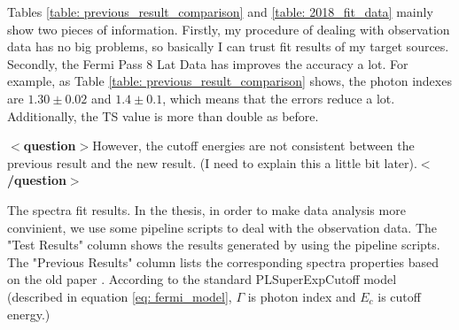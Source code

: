 \documentclass[12pt]{report}
\newcommand{\mycaption}[1]{\protect \caption{#1}}
\newcommand{\question}[1]{
  $<$\textbf{question}$>$#1$<$\textbf{/question}$>$
}
\begin{document}
          Tables \ref{table: previous_result_comparison} and \ref{table: 2018_fit_data} mainly 
          show two pieces of information. Firstly, my procedure of dealing with observation data has no
          big problems, so basically I can trust fit results of my target sources. Secondly, the Fermi 
          Pass 8 Lat Data has improves the accuracy a lot. For example, as Table 
          \ref{table: previous_result_comparison} shows, the photon indexes are 
          $1.30\pm0.02$ and $1.4\pm0.1$, which means that the errors reduce a lot. Additionally, the TS 
          value is more than double as before.
          \question{However, the cutoff energies are not consistent between the previous result and the new result.
            (I need to explain this a little bit later).}
          \vspace{1cm} 
          \begin{table}[!ht]
            \centering
            \vspace{0.5cm}
              \centering
              \mycaption{The spectra fit results. In the thesis, in order to make data analysis more 
                convinient, we use some pipeline scripts to deal with the observation data. 
                The "Test Results" column
                shows the results generated by using the pipeline scripts. The "Previous Results" column lists the 
                corresponding spectra properties based on the old paper \cite{0067-0049-208-2-17}.
                According to the standard PLSuperExpCutoff model (described in equation \ref{eq: fermi_model}, 
                $\Gamma$ is photon index and $E_c$ is cutoff energy.)}
              
              \label{table: previous_result_comparison}
          \end{table}
          \vspace{1cm}            
\end{document}
